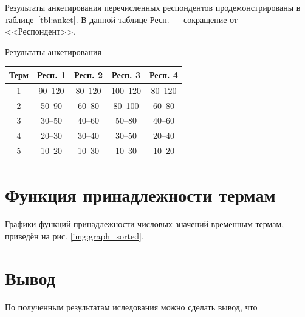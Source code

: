 Результаты анкетирования перечисленных респондентов продемонстрированы в таблице~\ref{tbl:anket}. В данной таблице Респ. --- сокращение от <<Респондент>>.

\begin{center}
	\begin{threeparttable}
			\caption{Результаты анкетирования}
		\label{tbl:anket}
	\begin{tabular}{|c|c|c|c|c|}\hline
		Терм & Респ. 1 & Респ. 2 & Респ. 3  & Респ. 4 \\ \hline
		1 & 90--120  &80--120  & 100--120 & 80--120\\ \hline 
		2 & 50--90  &  60--80  & 80--100& 60--80\\ \hline
		3&  30--50  & 40--60   &50--80 &  40--60 \\ \hline
		4 &  20--30 & 30--40  & 30--50 & 20--40 \\ \hline
		5 & 10--20    & 10--30 &10--30 &10--20  \\ \hline
\end{tabular}	
\end{threeparttable}
\end{center}

\section{Функция принадлежности термам}

Графики функций принадлежности числовых значений временным термам, приведён на рис. \ref{img:graph_sorted}.
\begin{center}
	\label{img:graph_sorted}
\end{center}

\section{Вывод}
По полученным результатам иследования можно сделать вывод, что 
